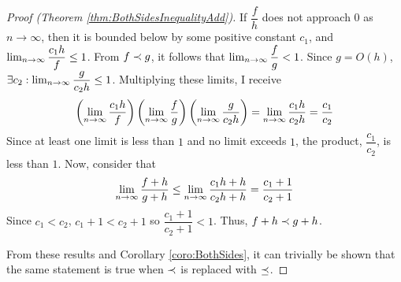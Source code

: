 \begin{proof}[Proof (Theorem \ref{thm:BothSidesInequalityAdd})]
	If $\dfrac{f}{h}$ does not approach $0$ as $n \to \infty$, then it is bounded below by some positive constant $c_1$, and $\lim_{n \to \infty} \dfrac{c_1 h}{f} \leq 1$. From $f \prec g$, it follows that $\lim_{n \to \infty} \dfrac{f}{g} < 1$. Since $g = O(h)$, $\exists c_2 : \lim_{n \to \infty} \dfrac{g}{c_2 h} \leq 1$. Multiplying these limits, I receive
	\begin{align*}
	\left( \lim_{n \to \infty} \frac{c_1 h}{f} \right) \left( \lim_{n \to \infty} \dfrac{f}{g} \right) \left( \lim_{n \to \infty} \dfrac{g}{c_2 h} \right) = \lim_{n \to \infty} \frac{c_1 h}{c_2 h} = \frac{c_1}{c_2}
	\end{align*}
	Since at least one limit is less than $1$ and no limit exceeds $1$, the product, $\dfrac{c_1}{c_2}$, is less than $1$. Now, consider that
	\begin{align*}
	\lim_{n \to \infty} \frac{f + h}{g + h} \leq \lim_{n \to \infty} \frac{c_1 h + h}{c_2 h + h} = \frac{c_1 + 1}{c_2 + 1}
	\end{align*}
	Since $c_1 < c_2$, $c_1 + 1 < c_2 + 1$ so $\dfrac{c_1 + 1}{c_2 + 1} < 1$. Thus, $f + h \prec g + h$.
	
	From these results and Corollary \ref{coro:BothSides}, it can trivially be shown that the same statement is true when $\prec$ is replaced with $\preceq$.
\end{proof}